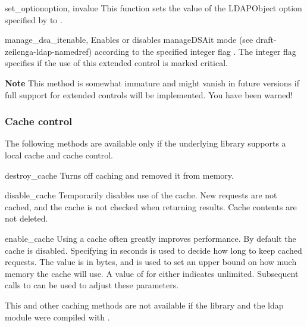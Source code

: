 \begin{methoddesc}[LDAP]{set_option}{option, invalue} %
  This function sets the value of the LDAPObject option
  specified by  to .
\end{methoddesc}


\begin{methoddesc}[LDAP]{manage_dsa_it}{enable, }
Enables or disables manageDSAit mode (see draft-zeilenga-ldap-namedref)
according to the specified integer flag . The
integer flag  specifies if the use of this extended
control is marked critical.

\textbf{Note}
This method is somewhat immature and might vanish in future versions
if full support for extended controls will be implemented. You have been
warned!
\end{methoddesc}

\subsubsection{Cache control}

The following methods are available only if the underlying library
supports a local cache and cache control.


\begin{methoddesc}[LDAP]{destroy_cache}{}
Turns off caching and removed it from memory.
\end{methoddesc}


\begin{methoddesc}[LDAP]{disable_cache}{}
Temporarily disables use of the cache. New requests are not cached, and
the cache is not checked when returning results. Cache contents are not
deleted.
\end{methoddesc}


\begin{methoddesc}[LDAP]{enable_cache}{}
Using a cache often greatly improves performance. By default the cache
is disabled. Specifying  in seconds is used to decide how long
to keep cached requests. The  value is in bytes, and is used
to set an upper bound on how much memory the cache will use. A value of
 for either indicates unlimited. 
Subsequent calls to
 can be used to adjust these parameters.

This and other caching methods are not available if the library and the 
ldap module were compiled with .
\end{methoddesc}

